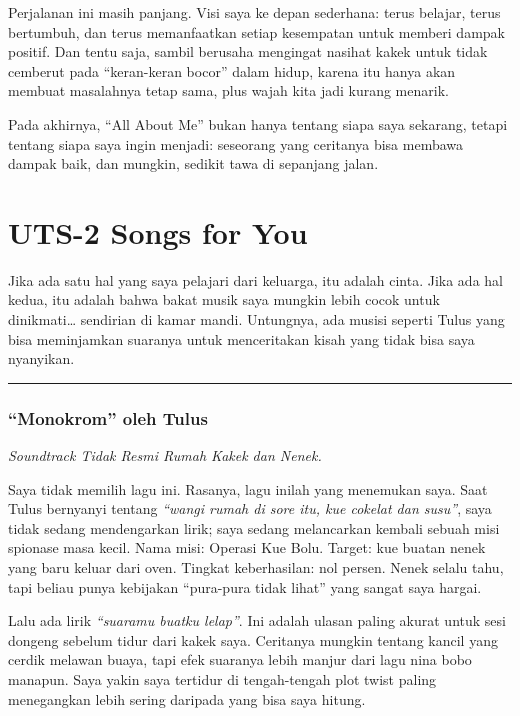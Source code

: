 \documentclass[
  letterpaper,
  DIV=11,
  numbers=noendperiod]{scrreprt}
\begin{document}
Perjalanan ini masih panjang. Visi saya ke depan sederhana: terus
belajar, terus bertumbuh, dan terus memanfaatkan setiap kesempatan untuk
memberi dampak positif. Dan tentu saja, sambil berusaha mengingat
nasihat kakek untuk tidak cemberut pada ``keran-keran bocor'' dalam
hidup, karena itu hanya akan membuat masalahnya tetap sama, plus wajah
kita jadi kurang menarik.

Pada akhirnya, ``All About Me'' bukan hanya tentang siapa saya sekarang,
tetapi tentang siapa saya ingin menjadi: seseorang yang ceritanya bisa
membawa dampak baik, dan mungkin, sedikit tawa di sepanjang jalan.


\chapter{UTS-2 Songs for You}\label{uts-2-songs-for-you}

Jika ada satu hal yang saya pelajari dari keluarga, itu adalah cinta.
Jika ada hal kedua, itu adalah bahwa bakat musik saya mungkin lebih
cocok untuk dinikmati\ldots{} sendirian di kamar mandi. Untungnya, ada
musisi seperti Tulus yang bisa meminjamkan suaranya untuk menceritakan
kisah yang tidak bisa saya nyanyikan.

\begin{center}\rule{0.5\linewidth}{0.5pt}\end{center}

\subsection{``Monokrom'' oleh Tulus}\label{monokrom-oleh-tulus}

\emph{Soundtrack Tidak Resmi Rumah Kakek dan Nenek.}

Saya tidak memilih lagu ini. Rasanya, lagu inilah yang menemukan saya.
Saat Tulus bernyanyi tentang \emph{``wangi rumah di sore itu, kue
cokelat dan susu''}, saya tidak sedang mendengarkan lirik; saya sedang
melancarkan kembali sebuah misi spionase masa kecil. Nama misi: Operasi
Kue Bolu. Target: kue buatan nenek yang baru keluar dari oven. Tingkat
keberhasilan: nol persen. Nenek selalu tahu, tapi beliau punya kebijakan
``pura-pura tidak lihat'' yang sangat saya hargai.

Lalu ada lirik \emph{``suaramu buatku lelap''}. Ini adalah ulasan paling
akurat untuk sesi dongeng sebelum tidur dari kakek saya. Ceritanya
mungkin tentang kancil yang cerdik melawan buaya, tapi efek suaranya
lebih manjur dari lagu nina bobo manapun. Saya yakin saya tertidur di
tengah-tengah plot twist paling menegangkan lebih sering daripada yang
bisa saya hitung.
\end{document}

